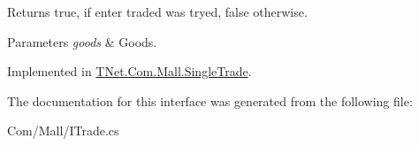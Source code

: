 \begin{DoxyReturn}{Returns}
{\ttfamily true}, if enter traded was tryed, {\ttfamily false} otherwise.
\end{DoxyReturn}

\begin{DoxyParams}{Parameters}
{\em goods} & Goods.\\
\hline
\end{DoxyParams}


Implemented in \mbox{\hyperlink{class_t_net_1_1_com_1_1_mall_1_1_single_trade_a1648ff3445ce2e71ba32fb4c1c0dfebf}{T\+Net.\+Com.\+Mall.\+Single\+Trade}}.



The documentation for this interface was generated from the following file\+:\begin{DoxyCompactItemize}
\item 
Com/\+Mall/I\+Trade.\+cs\end{DoxyCompactItemize}
